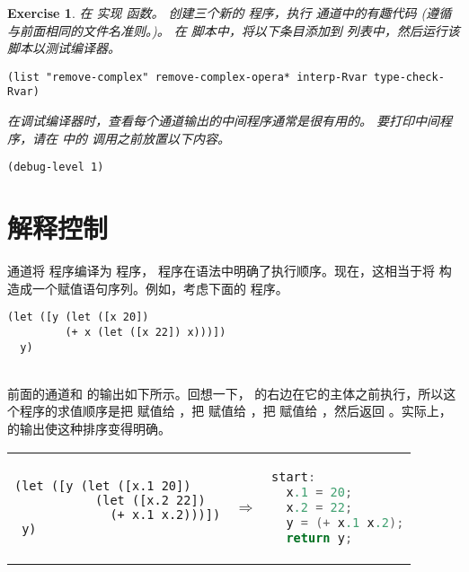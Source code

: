 \documentclass[11pt]{book}
\newtheorem{exercise}[theorem]{Exercise}
\begin{document}
\begin{exercise}\normalfont
%
在  实现  函数。
%
创建三个新的 \LangInt{} 程序，执行  通道中的有趣代码 (遵循与前面相同的文件名准则。)。
%
在  脚本中，将以下条目添加到  列表中，然后运行该脚本以测试编译器。
\begin{lstlisting}
(list "remove-complex" remove-complex-opera* interp-Rvar type-check-Rvar)
\end{lstlisting}
在调试编译器时，查看每个通道输出的中间程序通常是很有用的。 要打印中间程序，请在  中的
 调用之前放置以下内容。
\begin{lstlisting}
(debug-level 1)  
\end{lstlisting}
\end{exercise}


\section{解释控制}
\label{sec:explicate-control-Rvar}

  通道将 \LangVar{} 程序编译为 \LangCVar{}
程序， \LangCVar{} 程序在语法中明确了执行顺序。现在，这相当于将  构造成一个赋值语句序列。例如，考虑下面的
\LangVar{} 程序。\\
\begin{minipage}{0.96\textwidth}
\begin{lstlisting}
(let ([y (let ([x 20])
         (+ x (let ([x 22]) x)))])
  y)
\end{lstlisting}
\end{minipage}\\
%
前面的通道和  的输出如下所示。回想一下，  的右边在它的主体之前执行，所以这个程序的求值顺序是把  赋值给  ，把  赋值给  ，把
 赋值给  ，然后返回  。实际上，  的输出使这种排序变得明确。\\
\begin{tabular}{lll}
\begin{minipage}{0.4\textwidth}
\begin{lstlisting}
(let ([y (let ([x.1 20]) 
           (let ([x.2 22])
             (+ x.1 x.2)))])
 y)
\end{lstlisting}
\end{minipage}
&
$\Rightarrow$
&
\begin{minipage}{0.4\textwidth}
\begin{lstlisting}[language=C]
start:
  x.1 = 20;
  x.2 = 22;
  y = (+ x.1 x.2);
  return y;
\end{lstlisting}
\end{minipage}
\end{tabular}
\end{document}
